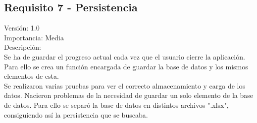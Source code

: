 \subsection{Requisito 7 - Persistencia }
Versión: 1.0\\
Importancia: Media\\
Descripción:\\
Se ha de guardar el progreso actual cada vez que el usuario cierre la aplicación. Para ello se crea un función encargada de guardar la base de datos y los mismos elementos de esta.\\
Se realizaron varias pruebas para ver el correcto almacenamiento y carga de los datos. Nacieron problemas de la necesidad de guardar un solo elemento de la base de datos. Para ello se separó la base de datos en distintos archivos ".xlsx", consiguiendo así la persistencia que se buscaba.